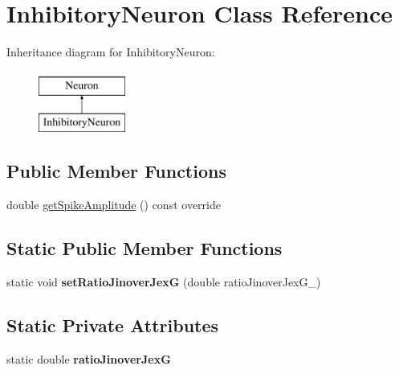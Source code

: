 \hypertarget{classInhibitoryNeuron}{\section{Inhibitory\-Neuron Class Reference}
\label{classInhibitoryNeuron}
}
Inheritance diagram for Inhibitory\-Neuron\-:\begin{figure}[H]
\begin{center}
\leavevmode
\includegraphics[height=2.000000cm]{classInhibitoryNeuron}
\end{center}
\end{figure}
\subsection*{Public Member Functions}
\begin{DoxyCompactItemize}
\item 
double \hyperlink{classInhibitoryNeuron_a762e2b7bcf64962f764031d991911b7a}{get\-Spike\-Amplitude} () const override
\end{DoxyCompactItemize}
\subsection*{Static Public Member Functions}
\begin{DoxyCompactItemize}
\item 
\hypertarget{classInhibitoryNeuron_a68a66521c5f33a5a01482e752fb1a72c}{static void {\bfseries set\-Ratio\-Jinover\-Jex\-G} (double ratio\-Jinover\-Jex\-G\-\_\-)}\label{classInhibitoryNeuron_a68a66521c5f33a5a01482e752fb1a72c}

\end{DoxyCompactItemize}
\subsection*{Static Private Attributes}
\begin{DoxyCompactItemize}
\item 
\hypertarget{classInhibitoryNeuron_ac30b4a5c967499f95bcf5c572107c263}{static double {\bfseries ratio\-Jinover\-Jex\-G}}\label{classInhibitoryNeuron_ac30b4a5c967499f95bcf5c572107c263}

\end{DoxyCompactItemize}


